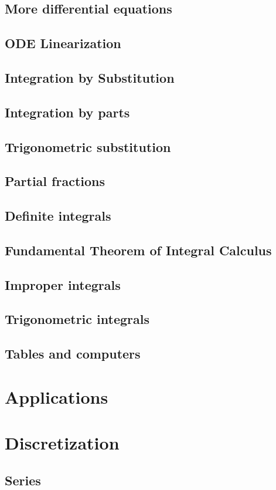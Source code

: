 \documentclass{book}
\begin{document}
\begin{sloppypar}
\section{More differential equations} \label{ChIntegrationSecMoreDifferentialEquations}
\section{ODE Linearization} \label{ChIntegrationSecODELinearization}
\section{Integration by Substitution} \label{ChIntegrationSecIntegrationBySubstitution}
\section{Integration by parts} \label{ChIntegrationSecIntegrationByParts}
\section{Trigonometric substitution} \label{ChIntegrationSecTrigonometricSubstitution}
\section{Partial fractions} \label{ChIntegrationSecPartialFractions}
\section{Definite integrals} \label{ChIntegrationSecDefiniteIntegrals}
\section{Fundamental Theorem of Integral Calculus} \label{ChIntegrationSecFundamentalTheoremOfIntegralCalculus}
\section{Improper integrals} \label{ChIntegrationSecImproperIntegrals}
\section{Trigonometric integrals} \label{ChIntegrationSecTrigonometricIntegrals}
\section{Tables and computers} \label{ChIntegrationSecTablesAndComputers}

\chapter{Applications} \label{ChApplications}

\chapter{Discretization} \label{ChDiscretization}
\section{Series} \label{ChDiscretizationSecSeries}

\end{sloppypar}
\end{document}
